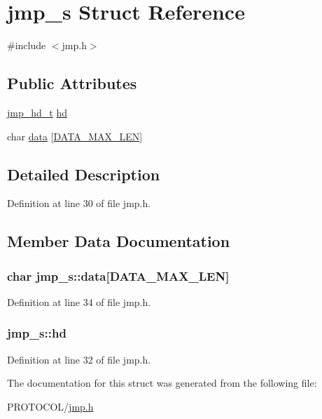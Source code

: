 \hypertarget{structjmp__s}{\section{jmp\-\_\-s Struct Reference}
\label{structjmp__s}
}


{\ttfamily \#include $<$jmp.\-h$>$}

\subsection*{Public Attributes}
\begin{DoxyCompactItemize}
\item 
\hyperlink{structjmp__hd__t}{jmp\-\_\-hd\-\_\-t} \hyperlink{structjmp__s_a82f1aed1e0d7986a040631e2364b40c9}{hd}
\item 
char \hyperlink{structjmp__s_af1c1a7d71a67030fa8f147c8e0cb8290}{data} \mbox{[}\hyperlink{jmp_8h_ab377b2c7e1ef521373a74f4200644495}{D\-A\-T\-A\-\_\-\-M\-A\-X\-\_\-\-L\-E\-N}\mbox{]}
\end{DoxyCompactItemize}


\subsection{Detailed Description}


Definition at line 30 of file jmp.\-h.



\subsection{Member Data Documentation}
\hypertarget{structjmp__s_af1c1a7d71a67030fa8f147c8e0cb8290}{
\subsubsection[{data}]{\setlength{\rightskip}{0pt plus 5cm}char jmp\-\_\-s\-::data\mbox{[}{\bf D\-A\-T\-A\-\_\-\-M\-A\-X\-\_\-\-L\-E\-N}\mbox{]}}}\label{structjmp__s_af1c1a7d71a67030fa8f147c8e0cb8290}


Definition at line 34 of file jmp.\-h.

\hypertarget{structjmp__s_a82f1aed1e0d7986a040631e2364b40c9}{
\subsubsection[{hd}]{ jmp\-\_\-s\-::hd}}\label{structjmp__s_a82f1aed1e0d7986a040631e2364b40c9}


Definition at line 32 of file jmp.\-h.



The documentation for this struct was generated from the following file\-:\begin{DoxyCompactItemize}
\item 
P\-R\-O\-T\-O\-C\-O\-L/\hyperlink{jmp_8h}{jmp.\-h}\end{DoxyCompactItemize}
